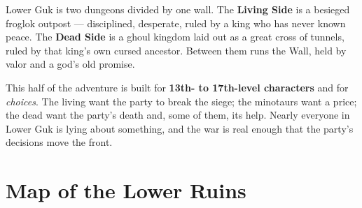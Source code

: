 \documentclass[10pt,twoside]{report}
\begin{document}
\noindent Lower Guk is two dungeons divided by one wall. The \textbf{Living Side} is a besieged froglok outpost --- disciplined, desperate, ruled by a king who has never known peace. The \textbf{Dead Side} is a ghoul kingdom laid out as a great cross of tunnels, ruled by that king's own cursed ancestor. Between them runs the Wall, held by valor and a god's old promise.

This half of the adventure is built for \textbf{13th- to 17th-level characters} and for \emph{choices}. The living want the party to break the siege; the minotaurs want a price; the dead want the party's death and, some of them, its help. Nearly everyone in Lower Guk is lying about something, and the war is real enough that the party's decisions move the front.

\section{Map of the Lower Ruins}
\end{document}
